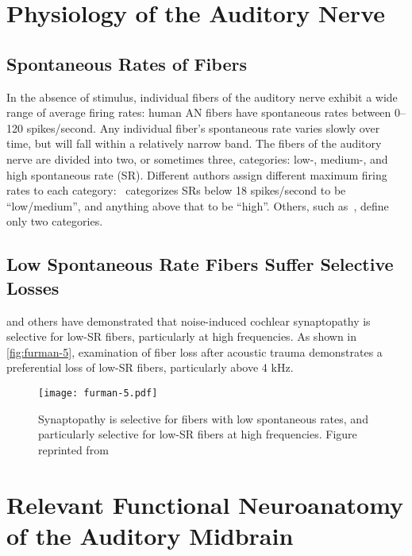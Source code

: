 \section{Physiology of the Auditory Nerve} %
\label{sec:physiology_of_the_auditory_nerve}
\subsection{Spontaneous Rates of Fibers} %
\label{sub:spontaneous_rates_of_fibers}
In the absence of stimulus, individual fibers of the auditory nerve exhibit a wide range of average firing rates: human AN fibers have spontaneous rates between 0--120 spikes/second.  Any individual fiber's spontaneous rate varies slowly over time, but will fall within a relatively narrow band.  The fibers of the auditory nerve are divided into two, or sometimes three, categories: low-, medium-, and high spontaneous rate (SR).  Different authors assign different maximum firing rates to each category:~\cite{Temchin2008Threshold} categorizes SRs below 18 spikes/second to be ``low/medium'', and anything above that to be ``high''.  Others, such as~\cite{Liberman1978AuditoryNerve}, define only two categories.  
\subsection{Low Spontaneous Rate Fibers Suffer Selective Losses} %
\label{sub:low_spontaneous_rate_fibers_suffer_selective_losses}
\cite{Furman2013NoiseInduced} and others have demonstrated that noise-induced cochlear synaptopathy is selective for low-SR fibers, particularly at high frequencies.  As shown in \autoref{fig:furman-5}, examination of fiber loss after acoustic trauma demonstrates a preferential loss of low-SR fibers, particularly above 4 kHz.  

\begin{figure}[htbp]
	\centering
	\texttt{[image: furman-5.pdf]}
	\caption[Synaptopathy is Selective]{Synaptopathy is selective for fibers with low spontaneous rates, and particularly selective for low-SR fibers at high frequencies. Figure reprinted from~\cite{Furman2013NoiseInduced}}
	\label{fig:furman-5}
\end{figure}

\section{Relevant Functional Neuroanatomy of the Auditory Midbrain} %
\label{sec:relevant_functional_neuroanatomy_of_the_auditory_midbrain}
